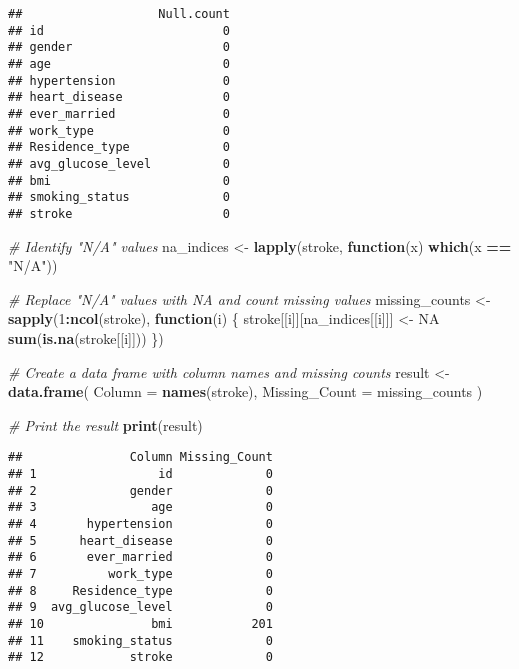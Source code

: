 \documentclass[
]{article}
\newenvironment{Shaded}{\begin{snugshade}}{\end{snugshade}}
\newcommand{\AttributeTok}[1]{\textcolor[rgb]{0.13,0.29,0.53}{#1}}
\newcommand{\CommentTok}[1]{\textcolor[rgb]{0.56,0.35,0.01}{\textit{#1}}}
\newcommand{\ConstantTok}[1]{\textcolor[rgb]{0.56,0.35,0.01}{#1}}
\newcommand{\ControlFlowTok}[1]{\textcolor[rgb]{0.13,0.29,0.53}{\textbf{#1}}}
\newcommand{\DecValTok}[1]{\textcolor[rgb]{0.00,0.00,0.81}{#1}}
\newcommand{\FunctionTok}[1]{\textcolor[rgb]{0.13,0.29,0.53}{\textbf{#1}}}
\newcommand{\NormalTok}[1]{#1}
\newcommand{\OtherTok}[1]{\textcolor[rgb]{0.56,0.35,0.01}{#1}}
\newcommand{\SpecialCharTok}[1]{\textcolor[rgb]{0.81,0.36,0.00}{\textbf{#1}}}
\newcommand{\StringTok}[1]{\textcolor[rgb]{0.31,0.60,0.02}{#1}}
\begin{document}
\begin{verbatim}
##                   Null.count
## id                         0
## gender                     0
## age                        0
## hypertension               0
## heart_disease              0
## ever_married               0
## work_type                  0
## Residence_type             0
## avg_glucose_level          0
## bmi                        0
## smoking_status             0
## stroke                     0
\end{verbatim}

\begin{Shaded}
\begin{Highlighting}[]
\CommentTok{\# Identify "N/A" values}
\NormalTok{na\_indices }\OtherTok{\textless{}{-}} \FunctionTok{lapply}\NormalTok{(stroke, }\ControlFlowTok{function}\NormalTok{(x) }\FunctionTok{which}\NormalTok{(x }\SpecialCharTok{==} \StringTok{"N/A"}\NormalTok{))}

\CommentTok{\# Replace "N/A" values with NA and count missing values}
\NormalTok{missing\_counts }\OtherTok{\textless{}{-}} \FunctionTok{sapply}\NormalTok{(}\DecValTok{1}\SpecialCharTok{:}\FunctionTok{ncol}\NormalTok{(stroke), }\ControlFlowTok{function}\NormalTok{(i) \{}
\NormalTok{  stroke[[i]][na\_indices[[i]]] }\OtherTok{\textless{}{-}} \ConstantTok{NA}
  \FunctionTok{sum}\NormalTok{(}\FunctionTok{is.na}\NormalTok{(stroke[[i]]))}
\NormalTok{\})}

\CommentTok{\# Create a data frame with column names and missing counts}
\NormalTok{result }\OtherTok{\textless{}{-}} \FunctionTok{data.frame}\NormalTok{(}
  \AttributeTok{Column =} \FunctionTok{names}\NormalTok{(stroke),}
  \AttributeTok{Missing\_Count =}\NormalTok{ missing\_counts}
\NormalTok{)}

\CommentTok{\# Print the result}
\FunctionTok{print}\NormalTok{(result)}
\end{Highlighting}
\end{Shaded}

\begin{verbatim}
##               Column Missing_Count
## 1                 id             0
## 2             gender             0
## 3                age             0
## 4       hypertension             0
## 5      heart_disease             0
## 6       ever_married             0
## 7          work_type             0
## 8     Residence_type             0
## 9  avg_glucose_level             0
## 10               bmi           201
## 11    smoking_status             0
## 12            stroke             0
\end{verbatim}
\end{document}
